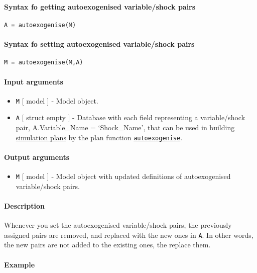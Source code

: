 


	\paragraph{Syntax fo getting autoexogenised variable/shock
pairs}

\begin{verbatim}
A = autoexogenise(M)
\end{verbatim}

\paragraph{Syntax fo setting autoexogenised variable/shock
pairs}

\begin{verbatim}
M = autoexogenise(M,A)
\end{verbatim}

\paragraph{Input arguments}

\begin{itemize}
\item
  \texttt{M} {[} model {]} - Model object.
\item
  \texttt{A} {[} struct \textbar{} empty {]} - Database with each field
  representing a variable/shock pair, A.Variable\_Name = `Shock\_Name',
  that can be used in building \href{plan/Contents}{simulation plans} by
  the plan function \href{plan/autoexogenise}{\texttt{autoexogenise}}.
\end{itemize}

\paragraph{Output arguments}

\begin{itemize}
\itemsep1pt\parskip0pt
\item
  \texttt{M} {[} model {]} - Model object with updated definitions of
  autoexogenised variable/shock pairs.
\end{itemize}

\paragraph{Description}

Whenever you set the autoexogenised variable/shock pairs, the previously
assigned pairs are removed, and replaced with the new ones in
\texttt{A}. In other words, the new pairs are not added to the existing
ones, the replace them.

\paragraph{Example}


